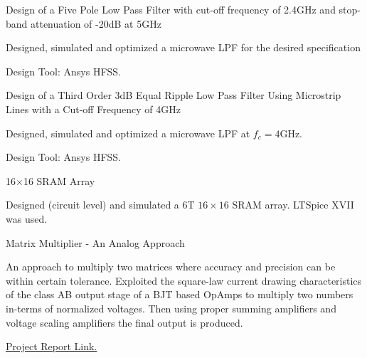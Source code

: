 \begin{cventries}
\begin{cventries}

  \cventry
    {Design of a Five Pole Low Pass Filter with cut-off frequency of 2.4GHz and stop-band attenuation of -20dB at 5GHz} %
    {} %
    {} %
    {} %
    {
      \begin{cvitems} %
        \item {Designed, simulated and optimized a microwave LPF for the desired specification}
        \item {Design Tool: Ansys HFSS.}
      \end{cvitems}
    }

  \cventry
    {Design of a Third Order 3dB Equal Ripple Low Pass Filter Using Microstrip Lines with a Cut-off Frequency of 4GHz} %
    {} %
    {} %
    {} %
    {
      \begin{cvitems} %
        \item {Designed, simulated and optimized a microwave LPF at $f_c=4$GHz.}
        \item {Design Tool: Ansys HFSS.}
      \end{cvitems}
    }


  \cventry
    {16$\times$16 SRAM Array} %
    {} %
    {} %
    {} %
    {
      \begin{cvitems} %
        \item {Designed (circuit level) and simulated a 6T $16\times16$ SRAM array. LTSpice XVII was used.}
      \end{cvitems}
    }


  \cventry
    {Matrix Multiplier - An Analog Approach} %
    {} %
    {} %
    {} %
    {
      \begin{cvitems} %
        \item {An approach to multiply two matrices where accuracy and precision can be within certain tolerance. Exploited the square-law current drawing characteristics of the class AB output stage of a BJT based OpAmps to multiply two numbers in-terms of normalized voltages. Then using proper summing amplifiers and voltage scaling amplifiers the final output is produced.}
        \item {\href{https://github.com/DhimanSarkar/BTech-Major-Project/raw/master/BTech Major Project/report.pdf}{Project Report Link.}}
      \end{cvitems}
    }


\end{cventries}
\end{cventries}
